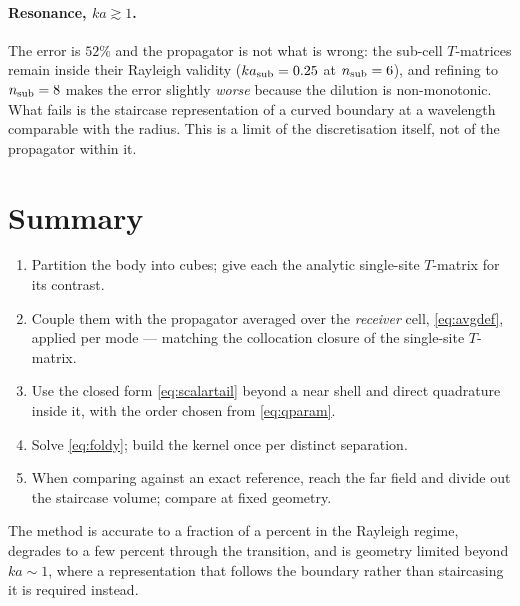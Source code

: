 \documentclass[11pt,a4paper]{article}
\begin{document}
\paragraph{Resonance, $ka\gtrsim1$.}  The error is $52\%$ and the propagator is
not what is wrong: the sub-cell $T$-matrices remain inside their Rayleigh
validity ($ka_{\rm sub} = 0.25$ at $n_{\rm sub}=6$), and refining to
$n_{\rm sub}=8$ makes the error slightly \emph{worse} because the dilution is
non-monotonic.  What fails is the staircase representation of a curved boundary
at a wavelength comparable with the radius.  This is a limit of the
discretisation itself, not of the propagator within it.

\section{Summary}

\begin{enumerate}
\item Partition the body into cubes; give each the analytic single-site
      $T$-matrix for its contrast.
\item Couple them with the propagator averaged over the \emph{receiver} cell,
      \eqref{eq:avgdef}, applied per mode --- matching the collocation closure
      of the single-site $T$-matrix.
\item Use the closed form \eqref{eq:scalartail} beyond a near shell and direct
      quadrature inside it, with the order chosen from \eqref{eq:qparam}.
\item Solve \eqref{eq:foldy}; build the kernel once per distinct separation.
\item When comparing against an exact reference, reach the far field and
      divide out the staircase volume; compare at fixed geometry.
\end{enumerate}

\noindent
The method is accurate to a fraction of a percent in the Rayleigh regime,
degrades to a few percent through the transition, and is geometry limited
beyond $ka\sim1$, where a representation that follows the boundary rather than
staircasing it is required instead.
\end{document}
